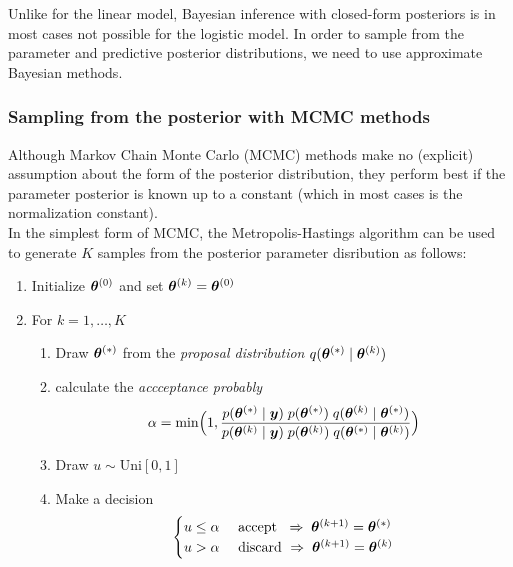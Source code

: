 Unlike for the linear model, Bayesian inference with closed-form posteriors is in most cases not possible for the logistic model.
In order to sample from the parameter and predictive posterior distributions, we need to use approximate Bayesian methods.


\subsubsection*{Sampling from the posterior with MCMC methods}

Although Markov Chain Monte Carlo (MCMC) methods make no (explicit) assumption about the form of the posterior distribution, they perform best if the parameter posterior is known up to a constant (which in most cases is the normalization constant).\\

In the simplest form of MCMC, the Metropolis-Hastings algorithm can be used to generate $K$ samples from the posterior parameter disribution as follows:

\begin{enumerate}
    \item Initialize $\bm{\theta}^{(0)}$ and set $\bm{\theta}^{(k)} = \bm{\theta}^{(0)}$
    \item For $k = 1, \dots, K$
    \begin{enumerate}
        \item Draw $\bm{\theta}^{(*)}$ from the \textit{proposal distribution} $q(\bm{\theta}^{(*)} \mid \bm{\theta}^{(k)})$
        \item calculate the \textit{accceptance probably} 
            \begin{equation*}
                \alpha = \min \Bigl(
                    1, \frac{
                        p(\bm{\theta}^{(*)} \mid \bm{y})\; p(\bm{\theta}^{(*)}) \; q(\bm{\theta}^{(k)} \mid \bm{\theta}^{(*)})}{
                            p(\bm{\theta}^{(k)} \mid \bm{y})\; p(\bm{\theta}^{(k)}) \; q(\bm{\theta}^{(*)} \mid \bm{\theta}^{(k)})
                        }
                    \Bigr)
            \end{equation*}
        \item Draw $u \sim \text{Uni}[0, 1]$
        \item Make a decision
            \begin{equation*}
                \begin{cases}
                    u \le \alpha & \text{ accept } \;\Rightarrow \; \bm{\theta}^{(k+1)} = \bm{\theta}^{(*)}\\
                    u > \alpha & \text{ discard } \Rightarrow \;\bm{\theta}^{(k+1)} = \bm{\theta}^{(k)}\\
                \end{cases}
            \end{equation*}
    \end{enumerate}
\end{enumerate}

